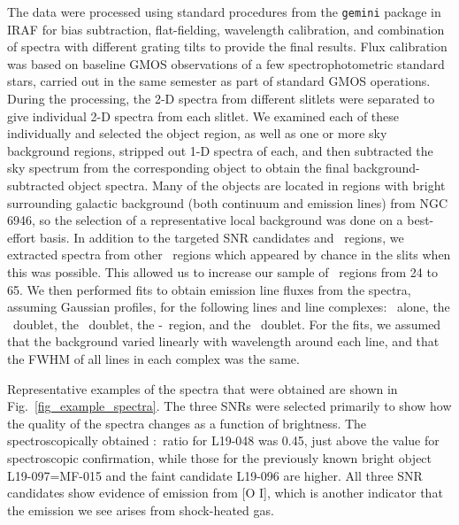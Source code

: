 The data were processed using standard procedures  from the {\tt gemini} package in IRAF  for bias subtraction, flat-fielding, wavelength calibration, and combination of spectra with different grating tilts to provide the final results.  
Flux calibration was based on baseline GMOS observations of a few spectrophotometric standard stars, carried out in the same semester as part of standard GMOS operations.  
During the processing, the 2-D spectra from different slitlets were separated to give individual 2-D spectra from each slitlet.   We examined each of these individually and selected the object region, as well as one or more sky background regions,  stripped out 1-D spectra of each, and then subtracted the sky spectrum from the corresponding object to obtain the final background-subtracted object spectra.  
Many of the objects are located in regions with bright surrounding galactic background (both continuum and emission lines) from NGC\,6946, so the selection of a representative local background was done on a best-effort basis.    In addition to the targeted SNR candidates and \hii\ regions, we extracted spectra from other \hii\ regions which appeared by chance in the slits when this was possible.   This allowed us to increase our sample of \hii\ regions from 24 to 65.
We then performed  fits to obtain emission line fluxes  from the spectra, assuming Gaussian profiles, for the following lines and line complexes:  \hb\ alone,  the \oiii\ doublet,  the \oi\ doublet,  the \ha-\nii\ region, and   the \sii\ doublet. For the fits, we assumed that the background varied linearly with wavelength around each line, and that the FWHM of all lines in each complex was the same.

Representative examples of the spectra that were obtained are shown in Fig.\ \ref{fig_example_spectra}.   The three SNRs were selected primarily to show how the quality of the spectra changes as a function of brightness.  The spectroscopically obtained \sii:\ha\ ratio for L19-048 was 0.45, just above the value for spectroscopic confirmation, while those for the previously known bright object L19-097=MF-015 and the faint candidate L19-096 are higher.  All three SNR candidates show evidence of emission from [O I], which is another indicator that the emission we see arises from shock-heated gas. 

